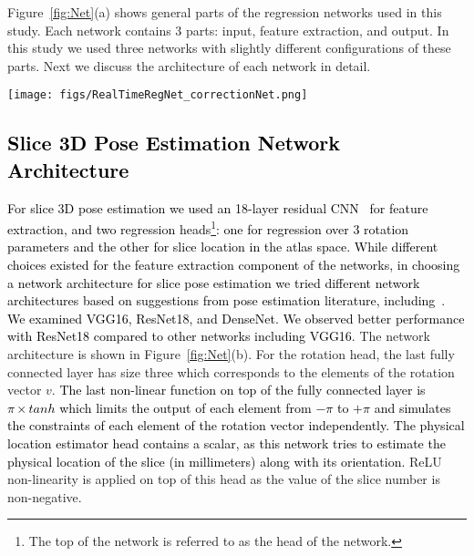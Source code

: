 \documentclass[journal,transmag]{IEEEtran}
\begin{document}
Figure~\ref{fig:Net}(a) shows general parts of the regression networks used in this study. Each network contains 3 parts: input, feature extraction, and output. In this study we used three networks with slightly different configurations of these parts. Next we discuss the architecture of each network in detail.   
\begin{figure*}
    \centering
    \texttt{[image: figs/RealTimeRegNet\_correctionNet.png]}
    \caption{Schematic diagram of the proposed networks: (a) Different parts of a regression network; \textcolor{black}{(b) The proposed architecture of the slice 3D pose estimation network; (c) The feature extraction part of the volume 3D pose estimation network; (d) The proposed architecture of the volume 3D pose estimation network; and (e) The correction network used for the prediction of both rotation and translation parameters between moving and reference images.}}
    \label{fig:Net}
\end{figure*}

\subsection{\textcolor{black}{Slice 3D Pose Estimation Network Architecture}}
\textcolor{black}{For slice 3D pose estimation we used an 18-layer residual CNN~\cite{he2016identity} for feature extraction, and \textcolor{black}{two regression heads\footnote{The top of the network is referred to as the head of the network.}}: one for regression over 3 rotation parameters and the other for slice location in the atlas space. }\textcolor{black}{While different choices existed for the feature extraction component of the networks, in choosing a network architecture for slice pose estimation we tried different network architectures based on suggestions from pose estimation literature, including~\cite{hou20183d}. We examined VGG16, ResNet18, and DenseNet. We observed better performance with ResNet18 compared to other networks including VGG16.} The network architecture is shown in Figure~\ref{fig:Net}(b). For the rotation head, the last fully connected layer has size three which corresponds to the elements of the rotation vector $v$. \textcolor{black}{The last non-linear function on top of the fully connected layer is $\pi \times tanh$ which limits the output of each element from $-\pi$ to $+\pi$ and simulates the constraints of each element of the rotation vector independently.} \textcolor{black}{The physical location estimator head contains a scalar, as this network tries to estimate the physical location of the slice (in millimeters) along with its orientation.} ReLU non-linearity is applied on top of this head as the value of the slice number is non-negative.
\end{document}
